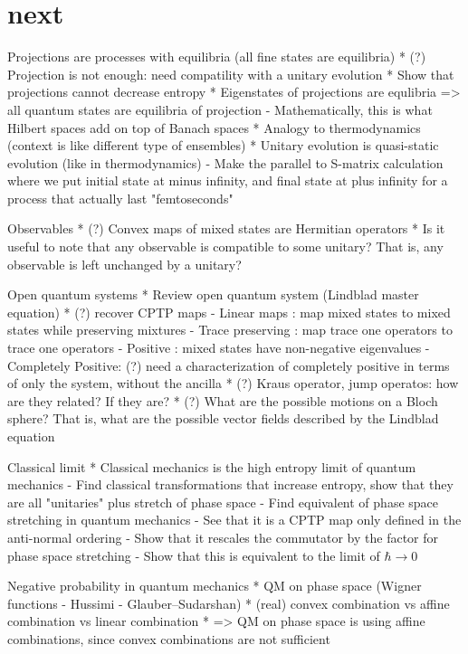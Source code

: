 \section{next}

Projections are processes with equilibria (all fine states are equilibria)
* (?) Projection is not enough: need compatility with a unitary evolution
* Show that projections cannot decrease entropy
* Eigenstates of projections are equlibria => all quantum states are equilibria of projection
  - Mathematically, this is what Hilbert spaces add on top of Banach spaces
* Analogy to thermodynamics (context is like different type of ensembles)
* Unitary evolution is quasi-static evolution (like in thermodynamics)
  - Make the parallel to S-matrix calculation where we put initial state at minus infinity, and final state at plus infinity for a process that actually last "femtoseconds"

Observables
* (?) Convex maps of mixed states are Hermitian operators
* Is it useful to note that any observable is compatible to some unitary? That is, any observable is left unchanged by a unitary?

Open quantum systems
* Review open quantum system (Lindblad master equation)
* (?) recover CPTP maps 
- Linear maps : map mixed states to mixed states while preserving mixtures
- Trace preserving : map trace one operators to trace one operators
- Positive : mixed states have non-negative eigenvalues
- Completely Positive: (?) need a characterization of completely positive in terms of only the system, without the ancilla
* (?) Kraus operator, jump operatos: how are they related? If they are?
* (?) What are the possible motions on a Bloch sphere? That is, what are the possible vector fields described by the Lindblad equation

Classical limit
* Classical mechanics is the high entropy limit of quantum mechanics
- Find classical transformations that increase entropy, show that they are all "unitaries" plus stretch of phase space
- Find equivalent of phase space stretching in quantum mechanics
- See that it is a CPTP map only defined in the anti-normal ordering
- Show that it rescales the commutator by the factor for phase space stretching
- Show that this is equivalent to the limit of $\hbar \to 0$

Negative probability in quantum mechanics
* QM on phase space (Wigner functions - Hussimi - Glauber–Sudarshan)
* (real) convex combination vs affine combination vs linear combination
* => QM on phase space is using affine combinations, since convex combinations are not sufficient

